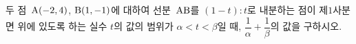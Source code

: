 두 점~$\mathrm{A}(-2{,}\mkern3mu\mathopen{}4)$, $\mathrm{B}(1{,}\mkern3mu\mathopen{}-1)$에 대하여 선분~$\mathrm{AB}$를 $(1-t):t$로 내분하는 점이 제$1$사분면 위에 있도록 하는 실수 $t$의 값의 범위가 $\alpha<t<\beta$일 때, $\dfrac{1}{\alpha}+\dfrac{1}{\beta}$의 값을 구하시오.
